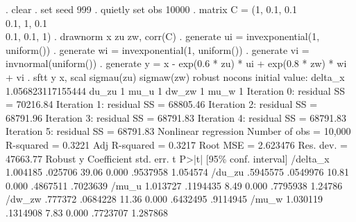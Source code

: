 . clear
{\smallskip}
. set seed 999
{\smallskip}
. quietly set obs 10000
{\smallskip}
. matrix C = (1, 0.1, 0.1 \\ 0.1, 1, 0.1 \\ 0.1, 0.1, 1)
{\smallskip}
. drawnorm x zu zw, corr(C)
{\smallskip}
. generate ui = invexponential(1, uniform())
{\smallskip}
. generate wi = invexponential(1, uniform())
{\smallskip}
. generate vi = invnormal(uniform())
{\smallskip}
. generate y = x - exp(0.6 * zu) * ui + exp(0.8 * zw) * wi + vi
{\smallskip}
. sftt y x, scal sigmau(zu) sigmaw(zw) robust nocons
initial value: delta_x 1.056823117155444 du_zu 1 mu_u 1 dw_zw 1 mu_w 1
{\smallskip}
Iteration 0:  residual SS =  70216.84
Iteration 1:  residual SS =  68805.46
Iteration 2:  residual SS =  68791.96
Iteration 3:  residual SS =  68791.83
Iteration 4:  residual SS =  68791.83
Iteration 5:  residual SS =  68791.83
{\smallskip}
{\smallskip}
Nonlinear regression                                Number of obs =     10,000
                                                    R-squared     =     0.3221
                                                    Adj R-squared =     0.3217
                                                    Root MSE      =   2.623476
                                                    Res. dev.     =   47663.77
{\smallskip}
{}
             {\VBAR}               Robust
           y {\VBAR} Coefficient  std. err.      t    P>|t|     [95\% conf. interval]
    /delta_x {\VBAR}   1.004185    .025706    39.06   0.000     .9537958    1.054574
      /du_zu {\VBAR}   .5945575   .0549976    10.81   0.000     .4867511    .7023639
       /mu_u {\VBAR}   1.013727   .1194435     8.49   0.000     .7795938     1.24786
      /dw_zw {\VBAR}    .777372   .0684228    11.36   0.000     .6432495    .9114945
       /mu_w {\VBAR}   1.030119   .1314908     7.83   0.000     .7723707    1.287868
